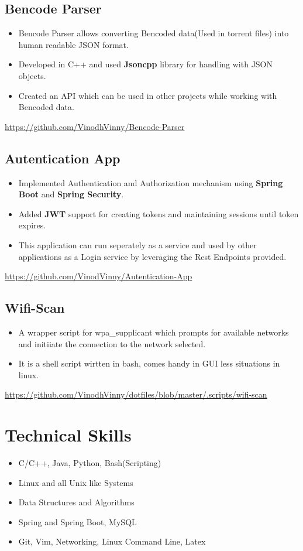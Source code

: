 \documentclass[11pt,a5paper]{article}
\begin{document}
\subsection{Bencode Parser}
\begin{itemize}[leftmargin=6mm]
	\setlength\itemsep{0em}
	\item{Bencode Parser allows converting Bencoded data(Used in torrent files) into human readable JSON format.}
	\item{Developed in C++ and used \textbf{Jsoncpp} library for handling with JSON objects.}
	\item{Created an API which can be used in other projects while working with Bencoded data.}
\end{itemize}
\vspace*{-0.5em}
\url{https://github.com/VinodhVinny/Bencode-Parser}

\subsection{Autentication App}
\begin{itemize}[leftmargin=6mm]
	\setlength\itemsep{0em}
	\item{Implemented Authentication and Authorization mechanism using \textbf{Spring Boot} and \textbf{Spring Security}.}
	\item{Added \textbf{JWT} support for creating tokens and maintaining sessions until token expires.}
	\item{This application can run seperately as a service and used by other applications as a Login service by leveraging the Rest Endpoints provided.}
\end{itemize}
\vspace*{-0.5em}
\url{https://github.com/VinodVinny/Autentication-App}

\subsection{Wifi-Scan}
\begin{itemize}[leftmargin=6mm]
	\setlength\itemsep{0em}
	\item{A wrapper script for wpa\_supplicant which prompts for available networks and initiiate the connection to the network selected.}
	\item{It is a shell script wirtten in bash, comes handy in GUI less situations in linux.}
\end{itemize}
\vspace*{-0.5em}
\url{https://github.com/VinodhVinny/dotfiles/blob/master/.scripts/wifi-scan}

\section{Technical Skills}
\begin{itemize}[leftmargin=3mm]
\item{C/C++, Java, Python, Bash(Scripting)}
\item{Linux and all Unix like Systems}
\item{Data Structures and Algorithms}
\item{Spring and Spring Boot, MySQL}
\item{Git, Vim, Networking, Linux Command Line, Latex}
\end{itemize}
\end{document}
